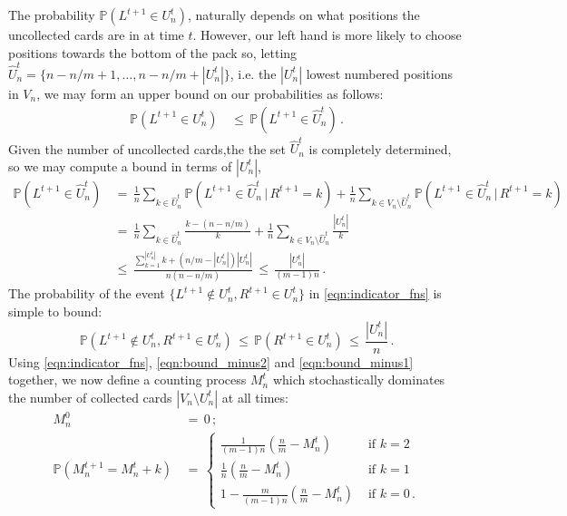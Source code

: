 \documentclass[11pt]{report}
\begin{document}
The probability $ \mathbb{P}(L^{t+1}\in U_n^t)$, naturally depends on what 
positions the 
uncollected cards are in at time $t$. However, our left hand is 
more likely to choose positions towards the bottom of the pack so, letting 
$\hat U_n^t = \{n-n/m+1,\dots,n-n/m+ |U_n^t|\}$, i.e. the $|U_n^t|$ 
lowest numbered positions in $V_n$, we may form an upper bound on our 
probabilities as follows:
\begin{align*}
\mathbb{P}(L^{t+1}\in U_n^t) &\,\le\, \mathbb{P}(L^{t+1}\in \hat U_n^t) \,.
\end{align*}
Given the number of uncollected cards,the 
the set $\hat U_{n}^{t}$ is completely determined, so we may compute a bound in terms of $|U_{n}^{t}|$, 
\begin{align}
\mathbb{P}(L^{t+1}\in \hat U_n^t) &\,=\, \frac 1n\sum_{k\in \hat 
	U_n^t}\mathbb{P}\left(L^{t+1}\in \hat U_n^t\,|\, R^{t+1}=k\right)+  
\frac 
1n\sum_{k\in V_n\setminus \hat U_n^t}\mathbb{P}\left(L^{t+1}\in \hat 
U_n^t\,|\, 
R^{t+1}=k\right) \nonumber \\
&\,=\, \frac 1n\sum_{k\in \hat U_n^t} \frac{k-(n-n/m)}{k} +  \frac 
1n\sum_{k\in 
	V_n\setminus \hat U_n^t}\frac{|U_n^t|}{k} \nonumber \\
&\,\le\, \frac{\sum_{k=1}^{|U_n^t|} k + (n/m -|U_n^t|)|U_n^t|}{n(n-n/m)} 
\,\le\,\frac{|U_n^t|}{(m-1)n}\,. \label{eqn:bound_minus2}
\end{align}
The probability of the event $\{L^{t+1}\notin U_n^t,R^{t+1}\in 
U_n^t\}$ in \eqref{eqn:indicator_fns} is simple 
to bound:
\begin{equation}\label{eqn:bound_minus1}
\mathbb{P}(L^{t+1}\notin U_n^t,R^{t+1}\in U_n^t) \,\le\, 
\mathbb{P}(R^{t+1}\in U_n^t) \,\le\, \frac{|U_n^t|}{n}\,.
\end{equation}
Using \eqref{eqn:indicator_fns}, \eqref{eqn:bound_minus2} and 
\eqref{eqn:bound_minus1} together, we now define a counting process $M_n^t$ 
which stochastically dominates the number of collected cards $|V_n\setminus 
U_n^{t}|$ at all times: 
\begin{align}
M_n^0 \,&=\, 0 \,; \nonumber \\
\mathbb{P}({M}^{t+1}_{n} = {M}^{t}_{n}+k) \,&=\, 
\begin{cases} 
\frac{1}{(m-1)n}\left(\frac{n}{m}-{M}^{t}_{n}\right) & \text{ 
	if } k=2\\
\frac{1}{n}\left(\frac{n}{m}-{M}^{t}_{n}\right) & \text{ if } k =1\\
1- \frac{m}{(m-1)n}\left(\frac{n}{m}-{M}^{t}_{n}\right) & 
\text{ if } k =0\,. \label{eqn:M_change}
\end{cases}
\end{align}
\end{document}
